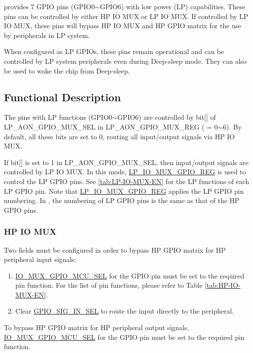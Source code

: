 \documentclass[main\_\_EN.tex]{subfiles}
\begin{document}
\chipname{} provides 7 GPIO pins (GPIO0$\sim$GPIO6) with low power (LP) capabilities. These pins can be controlled by either HP IO MUX or LP IO MUX. If controlled by LP IO MUX, these pins will bypass HP IO MUX and HP GPIO matrix for the use by peripherals in LP system.

When configured as LP GPIOs, these pins remain operational and can be controlled by LP system peripherals even during Deep-sleep mode. They can also be used to wake the chip from Deep-sleep.

\subsection{Functional Description}

The pins with LP functions (GPIO0$\sim$GPIO6) are controlled by bit[] of LP\_AON\_GPIO\_MUX\_SEL in LP\_AON\_GPIO\_MUX\_REG ( = 0$\sim$6). By default, all these bits are set to 0, routing all input/output signals via HP IO MUX.

If bit[] is set to 1 in LP\_AON\_GPIO\_MUX\_SEL, then input/output signals are controlled by LP IO MUX. In this mode, \hyperref[regdesc:LPIOMUXGPIONREG]{LP\_IO\_MUX\_GPIO\_REG} is used to control the LP GPIO pins. See \ref{tab:LP-IO-MUX-EN} for the LP functions of each LP GPIO pin. Note that \hyperref[regdesc:LPIOMUXGPIONREG]{LP\_IO\_MUX\_GPIO\_REG} applies the LP GPIO pin numbering. In \chipname{}, the numbering of LP GPIO pins is the same as that of the HP GPIO pins.

\subsubsection{HP IO MUX}
Two fields must be configured in order to bypass HP GPIO matrix for HP peripheral input signals:

\begin{enumerate}
\item \hyperref[fielddesc:IOMUXGPIONMCUSEL]{IO\_MUX\_GPIO\_MCU\_SEL} for the GPIO pin must be set to the required pin function. For the list of pin functions, please refer to Table \ref{tab:HP-IO-MUX-EN}.
\item Clear \hyperref[fielddesc:GPIOSIGNINSEL]{GPIO\_SIG\_IN\_SEL} to route the input directly to the peripheral.
\end{enumerate}

To bypass HP GPIO matrix for HP peripheral output signals, \hyperref[fielddesc:IOMUXGPIONMCUSEL]{IO\_MUX\_GPIO\_MCU\_SEL} for the GPIO pin must be set to the required pin function.
\end{document}
